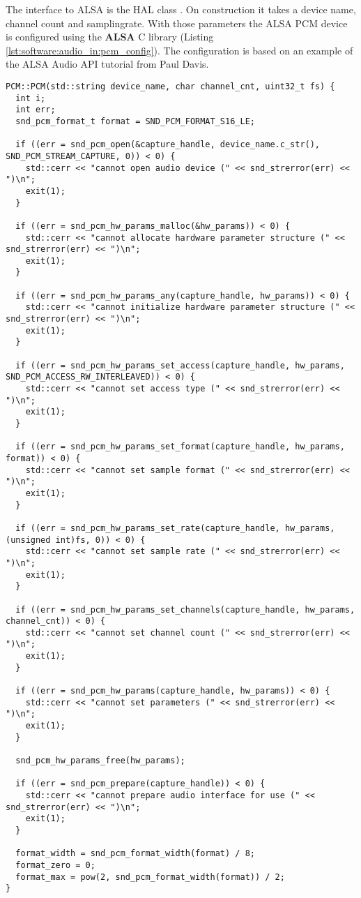The interface to ALSA is the HAL class . On construction it takes a device name, channel count and samplingrate. With those parameters the ALSA PCM device is configured using the \textbf{ALSA} C library (Listing \ref{lst:software:audio_in:pcm_config}).\cite{noauthor_alsa_nodate} The configuration is based on an example of the ALSA Audio API tutorial from Paul Davis.\cite{davis_tutorial_2002}\p
%
\begin{mdframed}
\begin{lstlisting}[caption=ALSA interface configuration, label=lst:software:audio_in:pcm_config]
PCM::PCM(std::string device_name, char channel_cnt, uint32_t fs) {
  int i;
  int err;
  snd_pcm_format_t format = SND_PCM_FORMAT_S16_LE;

  if ((err = snd_pcm_open(&capture_handle, device_name.c_str(), SND_PCM_STREAM_CAPTURE, 0)) < 0) {
    std::cerr << "cannot open audio device (" << snd_strerror(err) << ")\n";
    exit(1);
  }

  if ((err = snd_pcm_hw_params_malloc(&hw_params)) < 0) {
    std::cerr << "cannot allocate hardware parameter structure (" << snd_strerror(err) << ")\n";
    exit(1);
  }

  if ((err = snd_pcm_hw_params_any(capture_handle, hw_params)) < 0) {
    std::cerr << "cannot initialize hardware parameter structure (" << snd_strerror(err) << ")\n";
    exit(1);
  }

  if ((err = snd_pcm_hw_params_set_access(capture_handle, hw_params, SND_PCM_ACCESS_RW_INTERLEAVED)) < 0) {
    std::cerr << "cannot set access type (" << snd_strerror(err) << ")\n";
    exit(1);
  }

  if ((err = snd_pcm_hw_params_set_format(capture_handle, hw_params, format)) < 0) {
    std::cerr << "cannot set sample format (" << snd_strerror(err) << ")\n";
    exit(1);
  }

  if ((err = snd_pcm_hw_params_set_rate(capture_handle, hw_params, (unsigned int)fs, 0)) < 0) {
    std::cerr << "cannot set sample rate (" << snd_strerror(err) << ")\n";
    exit(1);
  }

  if ((err = snd_pcm_hw_params_set_channels(capture_handle, hw_params, channel_cnt)) < 0) {
    std::cerr << "cannot set channel count (" << snd_strerror(err) << ")\n";
    exit(1);
  }

  if ((err = snd_pcm_hw_params(capture_handle, hw_params)) < 0) {
    std::cerr << "cannot set parameters (" << snd_strerror(err) << ")\n";
    exit(1);
  }

  snd_pcm_hw_params_free(hw_params);

  if ((err = snd_pcm_prepare(capture_handle)) < 0) {
    std::cerr << "cannot prepare audio interface for use (" << snd_strerror(err) << ")\n";
    exit(1);
  }

  format_width = snd_pcm_format_width(format) / 8;
  format_zero = 0;
  format_max = pow(2, snd_pcm_format_width(format)) / 2;
}
\end{lstlisting}
\end{mdframed}
